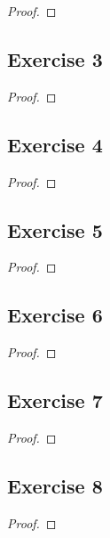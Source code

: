 \documentclass[14pt]{extarticle}
\begin{document}
\begin{proof}

\end{proof}

\subsection{Exercise 3}

\begin{proof}

\end{proof}

\subsection{Exercise 4}

\begin{proof}

\end{proof}

\subsection{Exercise 5}

\begin{proof}

\end{proof}

\subsection{Exercise 6}

\begin{proof}

\end{proof}

\subsection{Exercise 7}

\begin{proof}

\end{proof}

\subsection{Exercise 8}

\begin{proof}

\end{proof}
\end{document}
